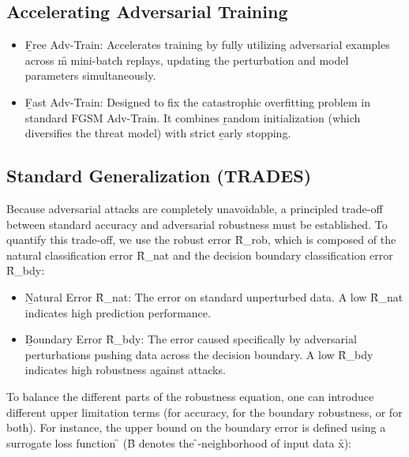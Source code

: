 \subsection{Accelerating Adversarial Training}
\begin{itemize}
    \item \b{Free Adv-Train}: Accelerates training by fully utilizing adversarial examples across \f{m} mini-batch replays, updating the perturbation and model parameters simultaneously.
    \item \b{Fast Adv-Train}: Designed to fix the catastrophic overfitting problem in standard FGSM Adv-Train. It combines \b{random initialization} (which diversifies the threat model) with strict \b{early stopping}.
\end{itemize}




\subsection{Standard Generalization (TRADES)}
Because adversarial attacks are completely unavoidable, a principled trade-off between standard accuracy and adversarial robustness must be established. To quantify this trade-off, we use the robust error \f{R_{rob}}, which is composed of the natural classification error \f{R_{nat}} and the decision boundary classification error \f{R_{bdy}}:

\begin{itemize}
\item \b{Natural Error \f{R_{nat}}}: The error on standard unperturbed data. A low \f{R_{nat}} indicates high prediction performance.
\item \b{Boundary Error \f{R_{bdy}}}: The error caused specifically by adversarial perturbations pushing data across the decision boundary. A low \f{R_{bdy}} indicates high robustness against attacks.
\end{itemize}

To balance the different parts of the robustness equation, one can introduce different upper limitation terms (for accuracy, for the boundary robustness, or for both). For instance, the upper bound on the boundary error is defined using a surrogate loss function \f{\phi} (\f{B} denotes the \f{\epsilon}-neighborhood of input data \f{x}):

